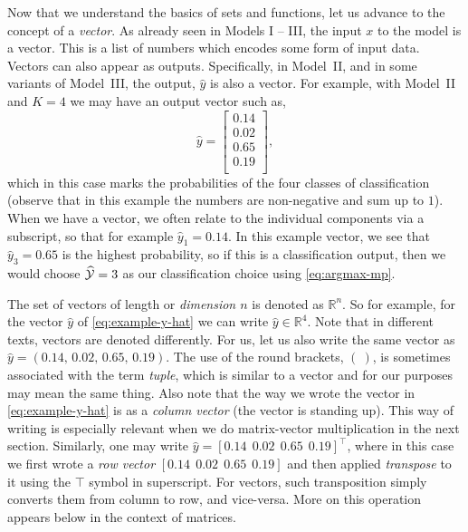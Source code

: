 \documentclass[12pt]{article}
\begin{document}
Now that we understand the basics of sets and functions, let us advance to the concept of a {\em vector}. As already seen in Models I -- III, the input $x$ to the model is a vector. This is a list of numbers which encodes some form of input data. Vectors can also appear as outputs. Specifically, in Model~II, and in some variants of Model~III, the output, $\hat{y}$ is also a vector. For example, with Model~II and $K=4$ we may have an output vector such as,
%
\begin{equation}
\label{eq:example-y-hat}
\hat{y} =
\begin{bmatrix}
0.14 \\
0.02\\
0.65 \\
0.19\\
\end{bmatrix},
\end{equation}
%
which in this case marks the probabilities of the four classes of classification (observe that in this example the numbers are non-negative and sum up to $1$). When we have a vector, we often relate to the individual components via a subscript, so that for example $\hat{y}_1 = 0.14$. In this example vector, we see that $\hat{y}_3 = 0.65$ is the highest probability, so if this is a classification output, then we would choose $\widehat{\cal Y} = 3$ as our classification choice using \eqref{eq:argmax-mp}.

The set of vectors of length or {\em dimension $n$} is denoted as ${\mathbb R}^n$. So for example, for the vector $\hat{y}$ of \eqref{eq:example-y-hat} we can write $\hat{y} \in {\mathbb R}^4$. Note that in different texts, vectors are denoted differently. For us, let us also write the same vector as $\hat{y} = (0.14,\, 0.02,\, 0.65,\, 0.19)$. The use of the round brackets, $(~)$, is sometimes associated with the term {\em tuple}, which is similar to a vector and for our purposes may mean the same thing. Also note that the way we wrote the vector in \eqref{eq:example-y-hat} is as a {\em column vector} (the vector is standing up). This way of writing is especially relevant when we do matrix-vector multiplication in the next section. Similarly, one may write $\hat{y} = [ 0.14~~ 0.02~~0.65~~0.19]^\top$, where in this case we first wrote a {\em row vector} $[ 0.14~~ 0.02~~ 0.65~~ 0.19]$ and then applied {\em transpose} to it using the $\top$ symbol in superscript. For vectors, such transposition simply converts them from column to row, and vice-versa. More on this operation appears below in the context of matrices.
\end{document}
